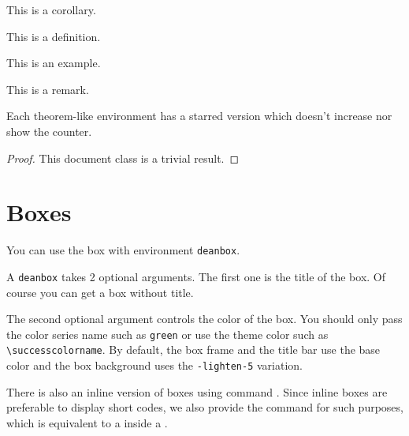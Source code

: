 \documentclass[showbib, lang=zh]{DeanReport}
\begin{document}
\begin{corollary}
    This is a corollary.
\end{corollary}

\begin{definition}
    This is a definition.
\end{definition}

\begin{example}
    This is an example.
\end{example}

\begin{remark}
    This is a remark.
\end{remark}

\begin{remark*}
    Each theorem-like environment has a starred version which doesn't increase nor show the counter.
\end{remark*}

\begin{proof}
    This document class is a trivial result.
\end{proof}

\section{Boxes}
\label{sec:boxes}
\begin{deanbox}
    You can use the box with environment \verb|deanbox|.
\end{deanbox}

\begin{deanbox}[]
    A \verb|deanbox| takes 2 optional arguments. The first one is the title of the box. Of course you can get a box without title.
\end{deanbox}

\begin{deanbox}
    The second optional argument controls the color of the box. You should only pass the color series name such as \verb|green| or use the theme color such as \verb|\successcolorname|. By default, the box frame and the title bar use the base color and the box background uses the \verb|-lighten-5| variation.
\end{deanbox}

There is also an inline version of boxes using command . Since inline boxes are preferable to display short codes, we also provide the command  for such purposes, which is equivalent to a  inside a .
\end{document}
